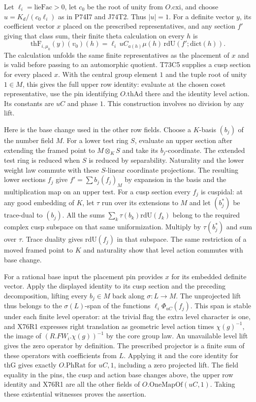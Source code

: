 Let $\ell_i=\mathrm{lieFac}>0$, let $c_0$ be the root of unity
from $O.\mathrm{cxi}$, and choose
$u=K_d/(c_0\ell_i)$ as in P74I7 and J74T2. Thus $|u|=1$.
For a definite vector $y$, its coefficient vector $x$ placed
on the prescribed representatives, and any section $f'$ giving
that class sum, their finite theta calculation on every $h$ is
\[
 \mathrm{thF}_{i,\mu_0}(y)(v_0)(h)
   =\ell_i\,u C_{a(h)}\mu(h)\,
             \mathrm{rdU}(f';\mathrm{dict}(h)).
\]
The calculation unfolds the same finite representatives as the
placement of $x$ and is valid before passing to an automorphic
quotient. T73C5 supplies a cusp section for every placed $x$.
With the central group element $1$ and the tuple root of unity
$1\in M$, this gives the full upper row identity: evaluate at
the chosen coset representative, use the pin identifying
$O.\mathrm{thAd}$ there and the identity level action. Its
constants are $uC$ and phase $1$. This construction involves
no division by any lift.

Here is the base change used in the other row fields. Choose a
$K$-basis $(b_j)$ of the number field $M$. For a lower test ring
$S$, evaluate an upper section after extending the framed point
to $M\otimes_K S$ and take its $b_j$-coordinate. The extended
test ring is reduced when $S$ is reduced by separability.
Naturality and the lower weight law commute with these
$S$-linear coordinate projections. The resulting lower sections
$f_j$ give $f'=\sum b_j(f_j)_M$ by expansion in the basis and
the multiplication map on an upper test. For a cusp section
every $f_j$ is cuspidal: at any good embedding of $K$, let $\tau$
run over its extensions to $M$ and let $(b_j^*)$ be trace-dual
to $(b_j)$. All the sums $\sum_k\tau(b_k)\mathrm{rdU}(f_k)$
belong to the required complex cusp subspace on that same
uniformization. Multiply by $\tau(b_j^*)$ and sum over $\tau$.
Trace duality gives $\mathrm{rdU}(f_j)$ in that subspace.
The same restriction of a moved framed point to $K$ and
naturality show that level action commutes with base change.

For a rational base input the placement pin provides $x$ for its
embedded definite vector. Apply the displayed identity to its cusp
section and the preceding decomposition, lifting every $b_j\in M$
back along $\sigma:L\to M$. The unprojected lift thus belongs to
the $\sigma(L)$-span of the functions $\ell_i\Phi_{uC}(f_j)$.
This span is stable under each finite level operator: at the trivial
flag the extra level character is one, and X76R1 expresses right
translation as geometric level action times $\chi(g)^{-1}$,
the image of $(R.FW_i.\chi(g))^{-1}$ by the core group law.
An unavailable level lift gives the zero operator by definition.
The prescribed projector is a finite sum of these operators with
coefficients from $L$. Applying it and the core identity for
$\mathrm{thG}$ gives exactly $O.\mathrm{PhRat}$ for $uC,1$,
including a zero projected lift. The field equality in the pins,
the cusp and action base changes above, the upper row identity
and X76R1 are all the other fields of $O.\mathrm{OneMapOf}(uC,1)$.
Taking these existential witnesses proves the assertion.

